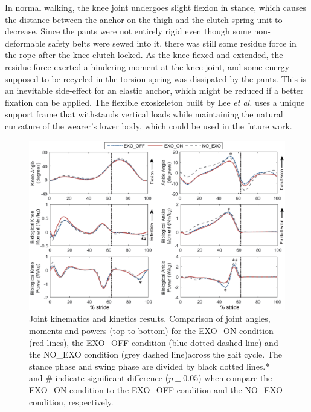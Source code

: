 \documentclass[twocolumn,cleanfoot,10pt]{asme2ej}
\begin{document}
In normal walking, the knee joint undergoes slight flexion in stance, which causes the distance between the anchor on the thigh and the clutch-spring unit to decrease.
Since the pants were not entirely rigid even though some non-deformable safety belts were sewed into it, there was still some residue force in the rope after the knee clutch locked.
As the knee flexed and extended, the residue force exerted a hindering moment at the knee joint, and some energy supposed to be recycled in the torsion spring was dissipated by the pants.
This is an inevitable side-effect for an elastic anchor, which might be reduced if a better fixation can be applied.
The flexible exoskeleton built by Lee \emph{et al.} \cite{exosuit} uses a unique support frame that withstands vertical loads while maintaining the natural curvature of the wearer's lower body, which could be used in the future work.

\begin{figure}[th]
	\centering
	\includegraphics[width=17cm]{compare.eps}
	\caption{Joint kinematics and kinetics results.
	Comparison of joint angles, moments and powers (top to bottom) for the EXO\_ON condition (red lines), the EXO\_OFF condition (blue dotted dashed line) and the NO\_EXO condition (grey dashed line)across the gait cycle.
	The stance phase and swing phase are divided by black dotted lines.* and \# indicate significant difference ($p\pm0.05$) when compare the EXO\_ON condition to the EXO\_OFF condition and the NO\_EXO condition, respectively.}
	\label{fig:kinetics}
\end{figure}
\end{document}
